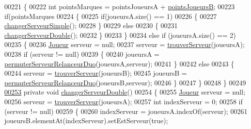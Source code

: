 \begin{DoxyCode}
00221     \{
00222         \textcolor{keywordtype}{int} pointsMarques = pointsJoueursA + \hyperlink{classcom_1_1example_1_1area_1_1_partie_ae1ceb321b45437487124b1d886c7297c}{pointsJoueursB};
00223         \textcolor{keywordflow}{if}(pointsMarques %
00224         \{
00225             \textcolor{keywordflow}{if}(joueursA.size() == 1)
00226             \{
00227                 \hyperlink{classcom_1_1example_1_1area_1_1_partie_ad6d7eef6348a783f9cdd0eb3dd14793d}{changerServeurSimple}();
00228             \}
00229             \textcolor{keywordflow}{else}
00230             \{
00231                 \hyperlink{classcom_1_1example_1_1area_1_1_partie_a14ae07774755900e3ae4e7e6808126c6}{changerServeurDouble}();
00232             \}
00233         \}
00234         \textcolor{keywordflow}{else} \textcolor{keywordflow}{if} (joueursA.size() == 2)
00235         \{
00236             \hyperlink{classcom_1_1example_1_1area_1_1_joueur}{Joueur} serveur = null;
00237             serveur = \hyperlink{classcom_1_1example_1_1area_1_1_partie_a34c737de89dee9e2510fa5959e238a3e}{trouverServeur}(joueursA);
00238             \textcolor{keywordflow}{if} (serveur != null)
00239             \{
00240                 joueursA = \hyperlink{classcom_1_1example_1_1area_1_1_partie_a3143072ab9e3a306a42a84ecac4bdcf1}{permuterServeurRelanceurDuo}(joueursA,serveur);
00241             \}
00242             \textcolor{keywordflow}{else}
00243             \{
00244                 serveur = \hyperlink{classcom_1_1example_1_1area_1_1_partie_a34c737de89dee9e2510fa5959e238a3e}{trouverServeur}(joueursB);
00245                 joueursB = \hyperlink{classcom_1_1example_1_1area_1_1_partie_a3143072ab9e3a306a42a84ecac4bdcf1}{permuterServeurRelanceurDuo}(joueursB,serveur);
00246             \}
00247         \}
00248     \}
00249 
\hyperlink{classcom_1_1example_1_1area_1_1_partie_a14ae07774755900e3ae4e7e6808126c6}{00253}     \textcolor{keyword}{private} \textcolor{keywordtype}{void} \hyperlink{classcom_1_1example_1_1area_1_1_partie_a14ae07774755900e3ae4e7e6808126c6}{changerServeurDouble}()
00254     \{
00255         \hyperlink{classcom_1_1example_1_1area_1_1_joueur}{Joueur} serveur = null;
00256         serveur = \hyperlink{classcom_1_1example_1_1area_1_1_partie_a34c737de89dee9e2510fa5959e238a3e}{trouverServeur}(joueursA);
00257         \textcolor{keywordtype}{int} indexServeur = 0;
00258         \textcolor{keywordflow}{if} (serveur != null)
00259         \{
00260             indexServeur = joueursA.indexOf(serveur);
00261             joueursB.elementAt(indexServeur).setEstServeur(\textcolor{keyword}{true});

\end{DoxyCode}
